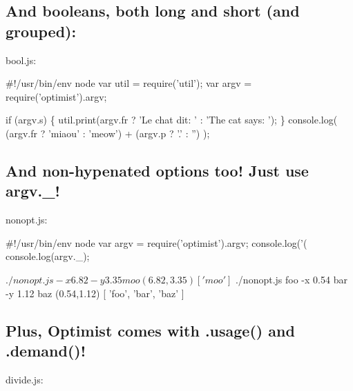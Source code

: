 \subsection*{And booleans, both long and short (and grouped)\+: }

bool.\+js\+:


\begin{DoxyCode}
#!/usr/bin/env node
var util = require('util');
var argv = require('optimist').argv;

if (argv.s) \{
    util.print(argv.fr ? 'Le chat dit: ' : 'The cat says: ');
\}
console.log(
    (argv.fr ? 'miaou' : 'meow') + (argv.p ? '.' : '')
);
\end{DoxyCode}






\subsection*{And non-\/hypenated options too! Just use {\ttfamily argv.\+\_\+}! }

nonopt.\+js\+:


\begin{DoxyCode}
#!/usr/bin/env node
var argv = require('optimist').argv;
console.log('(%
console.log(argv.\_);
\end{DoxyCode}




 \begin{DoxyVerb}$ ./nonopt.js -x 6.82 -y 3.35 moo
(6.82,3.35)
[ 'moo' ]

$ ./nonopt.js foo -x 0.54 bar -y 1.12 baz
(0.54,1.12)
[ 'foo', 'bar', 'baz' ]
\end{DoxyVerb}


\subsection*{Plus, Optimist comes with .usage() and .demand()! }

divide.\+js\+:






